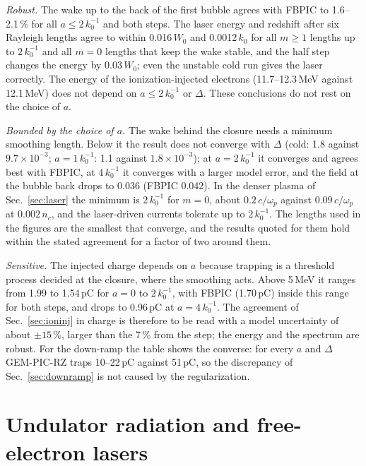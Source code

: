 \documentclass[preprint,12pt]{elsarticle}
\begin{document}
\emph{Robust.} The wake up to the back of the first bubble agrees with FBPIC to 1.6--2.1\,\% for all $a \le 2\,k_0^{-1}$ and both steps. The laser energy and redshift after six Rayleigh lengths agree to within 0.016\,$W_0$ and 0.0012\,$k_0$ for all $m \ge 1$ lengths up to $2\,k_0^{-1}$ and all $m = 0$ lengths that keep the wake stable, and the half step changes the energy by 0.03\,$W_0$; even the unstable cold run gives the laser correctly. The energy of the ionization-injected electrons (11.7--12.3\,MeV against 12.1\,MeV) does not depend on $a \le 2\,k_0^{-1}$ or $\Delta$. These conclusions do not rest on the choice of $a$.

\emph{Bounded by the choice of $a$.} The wake behind the closure needs a minimum smoothing length. Below it the result does not converge with $\Delta$ (cold: 1.8 against $9.7\times10^{-3}$; $a = 1\,k_0^{-1}$: 1.1 against $1.8\times10^{-3}$); at $a = 2\,k_0^{-1}$ it converges and agrees best with FBPIC, at $4\,k_0^{-1}$ it converges with a larger model error, and the field at the bubble back drops to 0.036 (FBPIC 0.042). In the denser plasma of Sec.~\ref{sec:laser} the minimum is $2\,k_0^{-1}$ for $m = 0$, about $0.2\,c/\omega_p$ against $0.09\,c/\omega_p$ at $0.002\,n_c$, and the laser-driven currents tolerate up to $2\,k_0^{-1}$. The lengths used in the figures are the smallest that converge, and the results quoted for them hold within the stated agreement for a factor of two around them.

\emph{Sensitive.} The injected charge depends on $a$ because trapping is a threshold process decided at the closure, where the smoothing acts. Above 5\,MeV it ranges from 1.99 to 1.54\,pC for $a = 0$ to $2\,k_0^{-1}$, with FBPIC (1.70\,pC) inside this range for both steps, and drops to 0.96\,pC at $a = 4\,k_0^{-1}$. The agreement of Sec.~\ref{sec:ioninj} in charge is therefore to be read with a model uncertainty of about $\pm15\,\%$, larger than the 7\,\% from the step; the energy and the spectrum are robust. For the down-ramp the table shows the converse: for every $a$ and $\Delta$ GEM-PIC-RZ traps 10--22\,pC against 51\,pC, so the discrepancy of Sec.~\ref{sec:downramp} is not caused by the regularization.


\section{Undulator radiation and free-electron lasers}\label{sec:fel}
\end{document}
